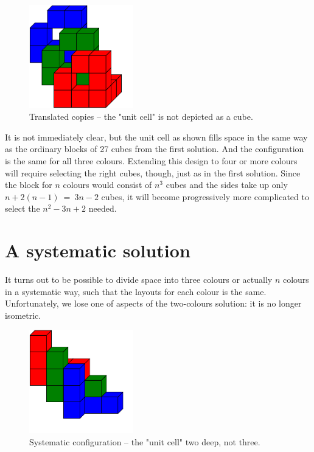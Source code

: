 \documentclass[onecolumn]{article}
\begin{document}
\begin{figure}
\center
\caption{Translated copies -- the "unit cell" is not depicted as a cube.}
\label{translated_three_colours}
\includegraphics[width=0.4\textwidth]{translated_three_colours.pdf}
\end{figure}

It is not immediately clear, but the unit cell as shown fills space in the same way as
the ordinary blocks of 27 cubes from the first solution. And the configuration is the same
for all three colours. Extending this design to four or more colours will require selecting
the right cubes, though, just as in the first solution. Since the block for $n$ colours would
consist of $n^3$ cubes and the sides take up only $n+2(n-1) ~=~ 3n-2$ cubes, it will become
progressively more complicated to select the $n^2 - 3n + 2$ needed.


\section*{A systematic solution}
It turns out to be possible to divide space into three colours or actually $n$ colours
in a systematic way, such that the layouts for each colour is the same. Unfortunately,
we lose one of aspects of the two-colours solution: it is no longer isometric.

\begin{figure}
\center
\caption{Systematic configuration -- the "unit cell" two deep, not three.}
\label{systematic_three_colours}
\includegraphics[width=0.4\textwidth]{systematic_three_colours.pdf}
\end{figure}
\end{document}
